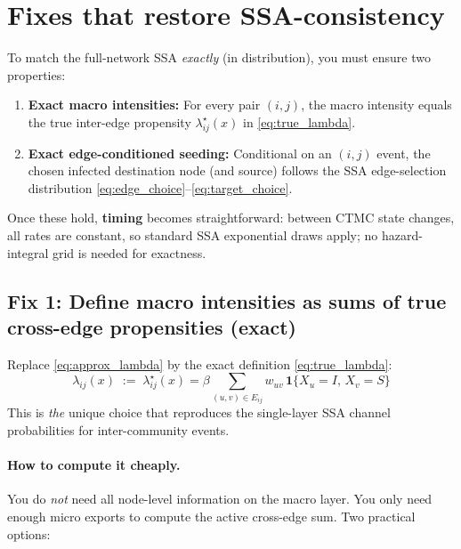 \documentclass[11pt,a4paper]{article}
\begin{document}
\section{Fixes that restore SSA-consistency}
\label{sec:fixes}

To match the full-network SSA \emph{exactly} (in distribution), you must ensure two properties:

\begin{enumerate}[leftmargin=*]
\item \textbf{Exact macro intensities:} For every pair $(i,j)$, the macro intensity equals the true inter-edge propensity
$\lambda^{\star}_{ij}(x)$ in \eqref{eq:true_lambda}.
\item \textbf{Exact edge-conditioned seeding:} Conditional on an $(i,j)$ event, the chosen infected destination node (and
source) follows the SSA edge-selection distribution \eqref{eq:edge_choice}--\eqref{eq:target_choice}.
\end{enumerate}

Once these hold, \textbf{timing} becomes straightforward: between CTMC state changes, all rates are constant,
so standard SSA exponential draws apply; no hazard-integral grid is needed for exactness.

\subsection{Fix 1: Define macro intensities as sums of true cross-edge propensities (exact)}
\label{sec:fix1}

Replace \eqref{eq:approx_lambda} by the exact definition \eqref{eq:true_lambda}:
\begin{equation}
\boxed{\;\lambda_{ij}(x)\;:=\;\lambda^{\star}_{ij}(x)=\beta\sum_{(u,v)\in E_{ij}} w_{uv}\,\mathbf{1}\{X_u=I,\,X_v=S\}\;}
\end{equation}
This is \emph{the} unique choice that reproduces the single-layer SSA channel probabilities for inter-community
events.

\paragraph{How to compute it cheaply.}
You do \emph{not} need all node-level information on the macro layer. You only need enough micro exports to
compute the active cross-edge sum. Two practical options:
\end{document}
